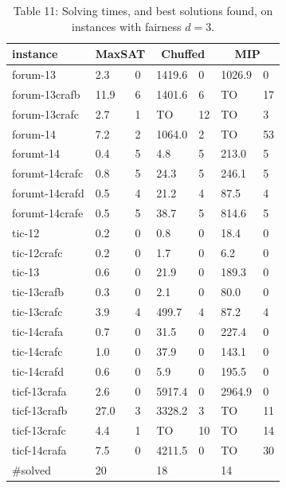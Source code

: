 \documentclass[10pt]{article}
\begin{document}
\begin{table}[h]
\begin{center}
\captionsetup{labelformat=empty}
\caption{Table 11: Solving times, and best solutions found, on instances with fairness $d=3$.}
\begin{tabular}{|l|l|l|l|l|l|l|}
\hline
instance & \multicolumn{2}{|c|}{MaxSAT} & \multicolumn{2}{|c|}{Chuffed} & \multicolumn{2}{|c|}{MIP} \\
\hline
forum-13 & 2.3 & 0 & 1419.6 & 0 & 1026.9 & 0 \\
\hline
forum-13crafb & 11.9 & 6 & 1401.6 & 6 & TO & 17 \\
\hline
forum-13crafc & 2.7 & 1 & TO & 12 & TO & 3 \\
\hline
forum-14 & 7.2 & 2 & 1064.0 & 2 & TO & 53 \\
\hline
forumt-14 & 0.4 & 5 & 4.8 & 5 & 213.0 & 5 \\
\hline
forumt-14crafc & 0.8 & 5 & 24.3 & 5 & 246.1 & 5 \\
\hline
forumt-14crafd & 0.5 & 4 & 21.2 & 4 & 87.5 & 4 \\
\hline
forumt-14crafe & 0.5 & 5 & 38.7 & 5 & 814.6 & 5 \\
\hline
tic-12 & 0.2 & 0 & 0.8 & 0 & 18.4 & 0 \\
\hline
tic-12crafc & 0.2 & 0 & 1.7 & 0 & 6.2 & 0 \\
\hline
tic-13 & 0.6 & 0 & 21.9 & 0 & 189.3 & 0 \\
\hline
tic-13crafb & 0.3 & 0 & 2.1 & 0 & 80.0 & 0 \\
\hline
tic-13crafc & 3.9 & 4 & 499.7 & 4 & 87.2 & 4 \\
\hline
tic-14crafa & 0.7 & 0 & 31.5 & 0 & 227.4 & 0 \\
\hline
tic-14crafc & 1.0 & 0 & 37.9 & 0 & 143.1 & 0 \\
\hline
tic-14crafd & 0.6 & 0 & 5.9 & 0 & 195.5 & 0 \\
\hline
ticf-13crafa & 2.6 & 0 & 5917.4 & 0 & 2964.9 & 0 \\
\hline
ticf-13crafb & 27.0 & 3 & 3328.2 & 3 & TO & 11 \\
\hline
ticf-13crafc & 4.4 & 1 & TO & 10 & TO & 14 \\
\hline
ticf-14crafa & 7.5 & 0 & 4211.5 & 0 & TO & 30 \\
\hline
\#solved & 20 &  & 18 &  & 14 &  \\
\hline
\end{tabular}
\end{center}
\end{table}
\end{document}
